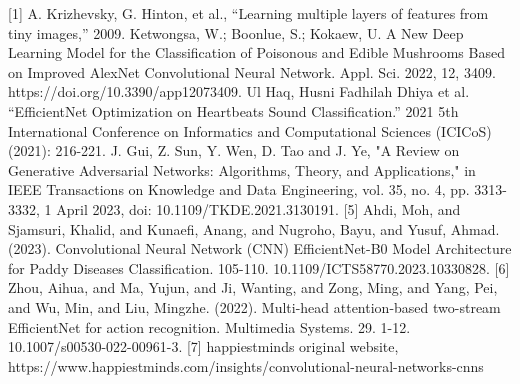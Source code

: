 [1] A. Krizhevsky, G. Hinton, et al., “Learning multiple layers of features
from tiny images,” 2009.
\hfill \break
[2] Ketwongsa, W.; Boonlue, S.; Kokaew, U. A New Deep Learning Model for the Classification of Poisonous and Edible Mushrooms Based on Improved AlexNet Convolutional Neural Network. Appl. Sci. 2022, 12, 3409. https://doi.org/10.3390/app12073409.
\hfill \break
[3]  Ul Haq, Husni Fadhilah Dhiya et al. “EfficientNet Optimization on Heartbeats Sound Classification.” 2021 5th International Conference on Informatics and Computational Sciences (ICICoS) (2021): 216-221.
\hfill \break
[4] J. Gui, Z. Sun, Y. Wen, D. Tao and J. Ye, "A Review on Generative Adversarial Networks: Algorithms, Theory, and Applications," in IEEE Transactions on Knowledge and Data Engineering, vol. 35, no. 4, pp. 3313-3332, 1 April 2023, doi: 10.1109/TKDE.2021.3130191.
[5] Ahdi, Moh, and Sjamsuri, Khalid, and Kunaefi, Anang, and  Nugroho, Bayu, and Yusuf, Ahmad. (2023). Convolutional Neural Network (CNN) EfficientNet-B0 Model Architecture for Paddy Diseases Classification. 105-110. 10.1109/ICTS58770.2023.10330828. 
[6] Zhou, Aihua, and Ma, Yujun, and Ji, Wanting, and Zong, Ming, and Yang, Pei, and Wu, Min, and Liu, Mingzhe. (2022). Multi-head attention-based two-stream EfficientNet for action recognition. Multimedia Systems. 29. 1-12. 10.1007/s00530-022-00961-3. 
[7] happiestminds original website, https://www.happiestminds.com/insights/convolutional-neural-networks-cnns